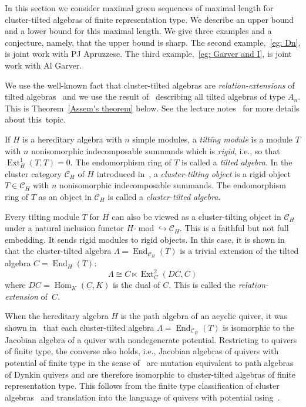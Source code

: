 \documentclass[ALCO,ThmDefs,Unicode,epreuves]{cedram}
\newcommand{\into}{\hookrightarrow}
\DeclareMathOperator{\Hom}{Hom}%
\DeclareMathOperator{\Ext}{Ext}%
\DeclareMathOperator{\End}{End}%
\DeclareMathOperator{\modr}{mod}
\newcommand{\cC}{\ensuremath{{\mathcal{C}}}}
\begin{document}
In this section we consider maximal green sequences of maximal length for cluster-tilted algebras of finite representation type. We describe an upper bound and a lower bound for this maximal length. We give three examples and a conjecture, namely, that the upper bound is sharp. The second example,~\ref{eg: Dn}, is joint work with PJ Apruzzese. The third example,~\ref{eg: Garver and I}, is joint work with Al Garver.

We use the well-known fact that cluster-tilted algebras are \emph{relation-extensions} of tilted algebras~\cite{ABS} and we use the result of~\cite{Asse} describing all tilted algebras of type $A_n$. This is Theorem~\ref{Assem's theorem} below. See the lecture notes~\cite{Asse2} for more details about this~topic.

If $H$ is a hereditary algebra with $n$ simple modules, a \emph{tilting module} is a module $T$ with $n$ nonisomorphic indecomposable summands which is \emph{rigid}, i.e., so that $\Ext_H^1(T,T)=0$. The endomorphism ring of $T$ is called a \emph{tilted algebra}. In the cluster category $\cC_H$ of $H$ introduced in~\cite{BMRRT}, a \emph{cluster-tilting object} is a rigid object $T\in \cC_H$ with $n$ nonisomorphic indecomposable summands. The endomorphism ring of $T$ as an object in $\cC_H$ is called a \emph{cluster-tilted algebra}. 

Every tilting module $T$ for $H$ can also be viewed as a cluster-tilting object in $\cC_H$ under a natural inclusion functor $H\text{-}\modr \into \cC_H$. This is a faithful but not full embedding. It sends rigid modules to rigid objects. In this case, it is shown in~\cite{ABS} that the cluster-tilted algebra $\Lambda=\End_{\cC_H}(T)$ is a trivial extension of the tilted algebra $C=\End_H(T)$:
\[
	\Lambda\cong C\ltimes \Ext^2_C(DC,C)
\] 
where $DC=\Hom_K(C,K)$ is the dual of $C$. This is called the \emph{relation-extension} of~$C$.

When the hereditary algebra $H$ is the path algebra of an acyclic quiver, it was shown in~\cite{BIRSm} that each cluster-tilted algebra $\Lambda=\End_{\cC_H}(T)$ is isomorphic to the Jacobian algebra of a quiver with nondegenerate potential. Restricting to quivers of finite type, the converse also holds, i.e., Jacobian algebras of quivers with potential of finite type in the sense of~\cite{FZ2} are mutation equivalent to path algebras of Dynkin quivers and are therefore isomorphic to cluster-tilted algebras of finite representation type. This follows from the finite type classification of cluster algebras~\cite{FZ2} and translation into the language of quivers with potential using~\cite{DWZ1}.
\end{document}
